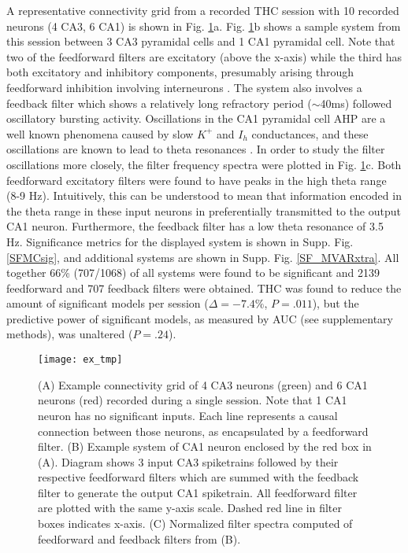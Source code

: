 \documentclass[11pt,a4paper,final]{article}
\begin{document}
A representative connectivity grid from a recorded THC session with 10 recorded neurons (4 CA3, 6 CA1) is shown in Fig. \ref{ex}a.
Fig. \ref{ex}b shows a sample system from this session between 3 CA3 pyramidal cells and 1 CA1 pyramidal cell.
Note that two of the feedforward filters are excitatory (above the x-axis) while the third has both excitatory and inhibitory components, presumably arising through feedforward inhibition involving interneurons \citep{pouille01,zemankovics13}.
The system also involves a feedback filter which shows a relatively long refractory period ($\sim$40ms) followed oscillatory bursting activity.
Oscillations in the CA1 pyramidal cell AHP are a well known phenomena caused by slow $K^+$ and $I_h$ conductances, and these oscillations are known to lead to theta resonances \citep{leung98,yarom00,sandler14}.
In order to study the filter oscillations more closely, the filter frequency spectra were plotted in Fig. \ref{ex}c.
Both feedforward excitatory filters were found to have peaks in the high theta range (8-9 Hz).
Intuitively, this can be understood to mean that information encoded in the theta range in these input neurons in preferentially transmitted to the output CA1 neuron.
Furthermore, the feedback filter has a low theta resonance of 3.5 Hz.
Significance metrics for the displayed system is shown in Supp. Fig. \ref{SFMCsig}, and additional systems are shown in Supp. Fig. \ref{SF_MVARxtra}.
All together 66\% (707/1068) of all systems were found to be significant and 2139 feedforward and 707 feedback filters were obtained.
THC was found to reduce the amount of significant models per session ($\Delta=-7.4\%$, $P=.011$), but the predictive power of significant models, as measured by AUC (see supplementary methods), was unaltered ($P=.24$).

\begin{figure}[!ht]
\centering
\texttt{[image: ex\_tmp]}
\caption[Example System]{
(A) Example connectivity grid of 4 CA3 neurons (green) and 6 CA1 neurons (red) recorded during a single session. Note that 1 CA1 neuron has no significant inputs. Each line represents a causal connection between those neurons, as encapsulated by a feedforward filter.
(B) Example system of CA1 neuron enclosed by the red box in (A). Diagram shows 3 input CA3 spiketrains followed by their respective feedforward filters which are summed with the feedback filter to generate the output CA1 spiketrain. All feedforward filter are plotted with the same y-axis scale. Dashed red line in filter boxes indicates x-axis.
(C) Normalized filter spectra computed of feedforward and feedback filters from (B).}
\label{ex}
\end{figure}
\end{document}
